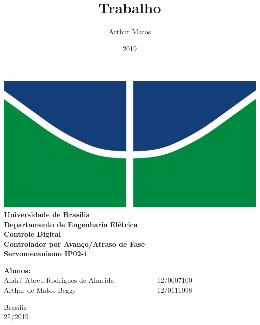 \documentclass{article}
\title{Trabalho}
\author{Arthur Matos}
\date{2019}
\newcommand{\ubar}[1]{\underaccent{\bar}{#1}}
\begin{document}
\begin{titlepage}
    \begin{center}
        \centering
        \includegraphics[width=.7\linewidth]{images/logo_unb.png}\\[0.5cm]
        {\large \textbf{Universidade de Brasília}}\\[0.2cm]
        {\large \textbf{Departamento de Engenharia Elétrica}}\\[0.2cm]
        {\large \textbf{Controle Digital}}\\[4.8cm]
        {\bf \huge {Controlador por Avanço/Atraso de Fase}}\\[0.2cm]
        {\bf \large {Servomecanismo IP02-1}}
    \end{center}

    \vfill
    \hspace{2cm} {\noindent \bf \large {Alunos:}}\\
    \vspace{0.8cm}
    \hspace{2.3cm} {\large André Abreu Rodrigues de Almeida ----------------- 12/0007100}\\[-0.6cm] 
    \vspace{0.1cm}
    \hspace{2.5cm} {\large Arthur de Matos Beggs --------------------------------- 12/0111098}\\[1cm]

    \begin{center}
        {\large Brasília}\\
        {\large 2$^{\ubar{\circ}}$/2019}
    \end{center}

\end{titlepage}
\clearpage
\setcounter{page}{2}
\clearpage

\end{document}
